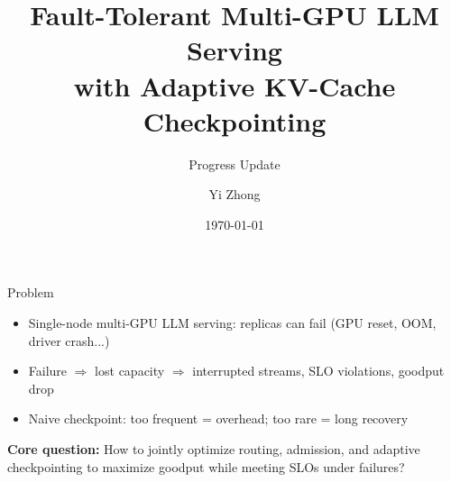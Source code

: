 \documentclass[aspectratio=169,12pt]{beamer}
\title{Fault-Tolerant Multi-GPU LLM Serving\\with Adaptive KV-Cache Checkpointing}
\subtitle{Progress Update}
\author{Yi Zhong}
\date{\today}
\begin{document}
\begin{frame}
\titlepage
\end{frame}

\begin{frame}{Problem}
\begin{itemize}
    \item Single-node multi-GPU LLM serving: replicas can fail (GPU reset, OOM, driver crash...)
    \item Failure $\Rightarrow$ lost capacity $\Rightarrow$ interrupted streams, SLO violations, goodput drop
    \item Naive checkpoint: too frequent = overhead; too rare = long recovery
\end{itemize}

\vspace{0.5em}
\textbf{Core question:} How to jointly optimize \textcolor{myblue}{routing}, \textcolor{myblue}{admission}, and \textcolor{myblue}{adaptive checkpointing} to maximize goodput while meeting SLOs under failures?
\end{frame}
\end{document}
